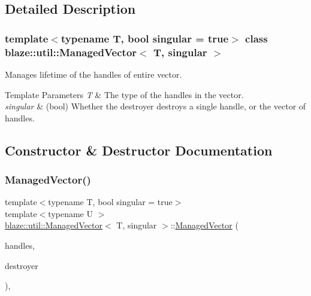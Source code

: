 \subsection{Detailed Description}
\subsubsection*{template$<$typename T, bool singular = true$>$\newline
class blaze\+::util\+::\+Managed\+Vector$<$ T, singular $>$}

Manages lifetime of the handles of entire vector. 


\begin{DoxyTemplParams}{Template Parameters}
{\em T} & The type of the handles in the vector. \\
\hline
{\em singular} & (bool) Whether the destroyer destroys a single handle, or the vector of handles. \\
\hline
\end{DoxyTemplParams}


\subsection{Constructor \& Destructor Documentation}
\mbox{\label{classblaze_1_1util_1_1ManagedVector_af065b9675c2de2a2bb162321dc4eb71e}} 
\subsubsection{\texorpdfstring{Managed\+Vector()}{ManagedVector()}}
{\footnotesize\ttfamily template$<$typename T, bool singular = true$>$ \\
template$<$typename U $>$ \\
\hyperlink{classblaze_1_1util_1_1ManagedVector}{blaze\+::util\+::\+Managed\+Vector}$<$ T, singular $>$\+::\hyperlink{classblaze_1_1util_1_1ManagedVector}{Managed\+Vector} (\begin{DoxyParamCaption}\item[{const std\+::vector$<$ T $>$ \&}]{handles,  }\item[{U}]{destroyer }\end{DoxyParamCaption})\hspace{0.3cm}{\ttfamily [inline]}, {\ttfamily [noexcept]}}



